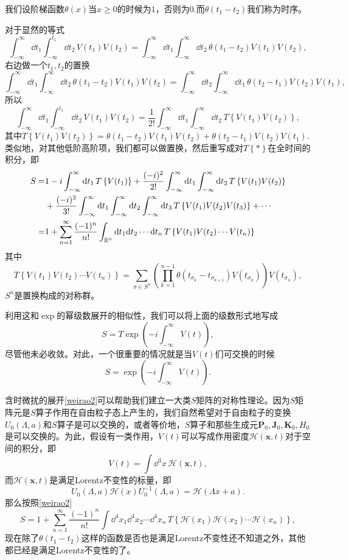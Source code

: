 \documentclass[9pt]{extbook}
\begin{document}
我们设阶梯函数$\theta(x)$当$x\geq 0$的时候为$1$，否则为$0$.而$\theta(t_1-t_2)$我们称为时序。

对于显然的等式
\[
	\int_{-\infty}^{\infty}\dd t_1\int_{-\infty}^{t_1}\dd t_2\, V(t_1)V(t_2)=\int_{-\infty}^{\infty}\dd t_1\int_{-\infty}^{\infty}\dd t_2\, \theta(t_1-t_2)V(t_1)V(t_2),
\]
右边做一个$t_1,t_2$的置换
\[
	\int_{-\infty}^{\infty}\dd t_1\int_{-\infty}^{\infty}\dd t_2\, \theta(t_1-t_2)V(t_1)V(t_2)=\int_{-\infty}^{\infty}\dd t_2\int_{-\infty}^{\infty}\dd t_1\, \theta(t_2-t_1)V(t_2)V(t_1),
\]
所以
\[
	\int_{-\infty}^{\infty}\dd t_1\int_{-\infty}^{t_1}\dd t_2\, V(t_1)V(t_2)=\frac{1}{2!}\int_{-\infty}^{\infty}\dd t_1\int_{-\infty}^{\infty}\dd t_2\, T\left\{V(t_1)V(t_2)\right\},
\]
其中$T\left\{V(t_1)V(t_2)\right\}=\theta(t_1-t_2)V(t_1)V(t_2)+\theta(t_2-t_1)V(t_2)V(t_1)$.类似地，对其他低阶高阶项，我们都可以做置换，然后重写成对$T\left\{*\right\}$在全时间的积分，即
\begin{equation}
\label{weirao2}
\begin{split}
	S=&1-i\int_{-\infty}^{\infty}\mathrm{d} t_1 \, T\left\{V(t_1)\right\}+\frac{(-i)^2}{2!}\int_{-\infty}^{\infty}\mathrm{d} t_1\int_{-\infty}^{\infty}\mathrm{d} t_2\, T\left\{V(t_1)V(t_2)\right\}\\
	&+\frac{(-i)^3}{3!}\int_{-\infty}^{\infty}\mathrm{d} t_1\int_{-\infty}^{\infty}\mathrm{d} t_2\int_{-\infty}^{\infty}\mathrm{d} t_3\, T\left\{V(t_1)V(t_2)V(t_3)\right\}+\cdots\\
	=&1+\sum_{n=1}^{\infty}\frac{(-1)^n}{n!}\int_{\mathbb{R}^n}\mathrm{d} t_1\mathrm{d} t_2\cdots\mathrm{d} t_n\, T\left\{V(t_1)V(t_2)\cdots V(t_n)\right\}
\end{split}
\end{equation}
其中
\[
	T\left\{V(t_1)V(t_2)\cdots V(t_n)\right\}=\sum_{\sigma\in S^n}\left(\prod_{k=1}^{n-1}\theta(t_{\sigma_k}-t_{\sigma_{k+1}})V(t_{\sigma_k})
	\right)V(t_{\sigma_n}),
\]
$S^n$是置换构成的对称群。

利用这和$\exp$的幂级数展开的相似性，我们可以将上面的级数形式地写成
\[
	S=T\exp\left(-i\int_{-\infty}^{\infty}V(t)\right),
\]
尽管他未必收敛。对此，一个很重要的情况就是当$V(t)$们可交换的时候
\[
	S=\exp\left(-i\int_{-\infty}^{\infty}V(t)\right).
\]

含时微扰的展开\eqref{weirao2}可以帮助我们建立一大类$S$矩阵的对称性理论。因为$S$矩阵元是$S$算子作用在自由粒子态上产生的，我们自然希望对于自由粒子的变换$U_0(\Lambda,a)$和$S$算子是可以交换的，或者等价地，$S$算子和那些生成元$\bm{P}_0,\bm{J}_0,\bm{K}_0,H_0$是可以交换的。为此，假设有一类作用，$V(t)$可以写成作用密度$\mathscr{H}(\bm{x},t)$对于空间的积分，即
\[
	V(t)=\int \dd^3 x\,\mathscr{H}(\bm{x},t),
\]
而$\mathscr{H}(\bm{x},t)$是满足Lorentz不变性的标量，即
\[
	U_0(\Lambda,a)\mathscr{H}(x)U_0^{-1}(\Lambda,a)=\mathscr{H}(\Lambda x+a).
\]
那么按照\eqref{weirao2}
\[
S=1+\sum_{n=1}^{\infty}\frac{(-1)^n}{n!}\int\dd^4 x_1\dd^4 x_2\cdots\dd
^4 x_n\, T\left\{\mathscr{H}(x_1)\mathscr{H}(x_2)\cdots \mathscr{H}(x_n)\right\},
\]
现在除了$\theta(t_1-t_2)$这样的函数是否也是满足Lorentz不变性还不知道之外，其他都已经是满足Lorentz不变性的了。
\end{document}
